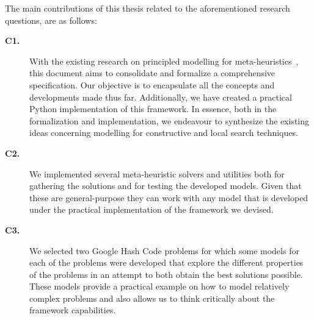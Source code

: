 The main contributions of this thesis related to the aforementioned research
questions, are as follows:

\begin{description}

  \item[\textbf{C1.}] With the existing research on principled modelling for
    meta-heuristics~\cite{vieira2009uma,fonseca2021nasf4nio,outeiro2021application},
    this document aims to consolidate and formalize a comprehensive specification.
    Our objective is to encapsulate all the concepts and developments made thus
    far. Additionally, we have created a practical Python implementation of this
    framework. In essence, both in the formalization and implementation, we
    endeavour to synthesize the existing ideas concerning modelling for
    constructive and local search techniques.

  \item[\textbf{C2.}] We implemented several meta-heuristic solvers and utilities
    both for gathering the solutions and for testing the developed models. Given
    that these are general-purpose they can work with any model that is developed
    under the practical implementation of the framework we devised.

  \item[\textbf{C3.}] We selected two Google Hash Code problems for which some
    models for each of the problems were developed that explore the different
    properties of the problems in an attempt to both obtain the best solutions
    possible. These models provide a practical example on how to model relatively
    complex problems and also allows us to think critically about the framework
    capabilities.
\end{description}